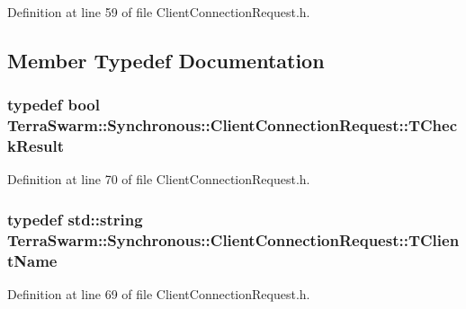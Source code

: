 Definition at line 59 of file Client\-Connection\-Request.\-h.



\subsection{Member Typedef Documentation}
\hypertarget{class_terra_swarm_1_1_synchronous_1_1_client_connection_request_af97d7c46396bc29dd8a2628f32a434f2}{
\subsubsection[{T\-Check\-Result}]{\setlength{\rightskip}{0pt plus 5cm}typedef bool {\bf Terra\-Swarm\-::\-Synchronous\-::\-Client\-Connection\-Request\-::\-T\-Check\-Result}}}\label{class_terra_swarm_1_1_synchronous_1_1_client_connection_request_af97d7c46396bc29dd8a2628f32a434f2}


Definition at line 70 of file Client\-Connection\-Request.\-h.

\hypertarget{class_terra_swarm_1_1_synchronous_1_1_client_connection_request_a7d85ca6773adf2b3b32cfbff9706f882}{
\subsubsection[{T\-Client\-Name}]{\setlength{\rightskip}{0pt plus 5cm}typedef std\-::string {\bf Terra\-Swarm\-::\-Synchronous\-::\-Client\-Connection\-Request\-::\-T\-Client\-Name}}}\label{class_terra_swarm_1_1_synchronous_1_1_client_connection_request_a7d85ca6773adf2b3b32cfbff9706f882}


Definition at line 69 of file Client\-Connection\-Request.\-h.



